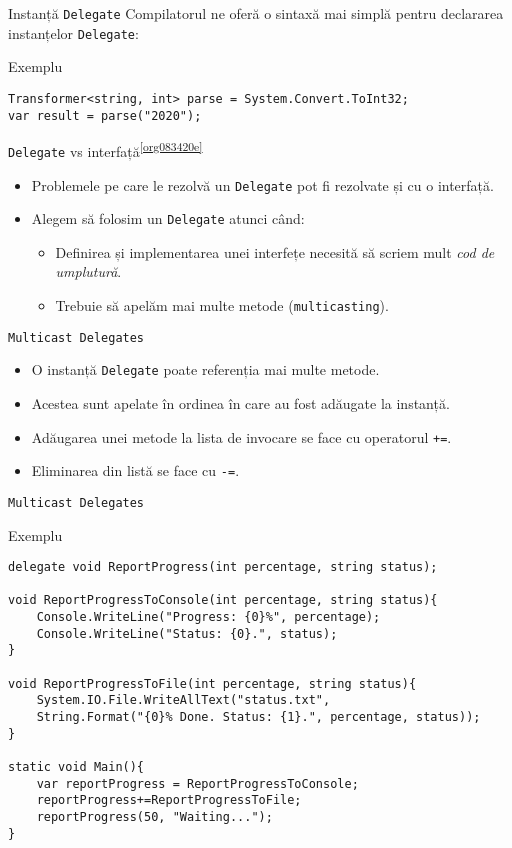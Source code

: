 \documentclass[presentation]{beamer}
\begin{document}
\begin{frame}[label={sec:org90f3885},fragile]{Instanță \texttt{Delegate}}
 Compilatorul ne oferă o sintaxă mai simplă pentru declararea instanțelor \texttt{Delegate}:
\begin{block}{Exemplu}
\begin{verbatim}
Transformer<string, int> parse = System.Convert.ToInt32;
var result = parse("2020");
\end{verbatim}
\end{block}
\end{frame}
\begin{frame}[label={sec:org1cbd9eb},fragile]{\texttt{Delegate} vs interfață\textsuperscript{\ref{org083420e}}}
 \begin{itemize}
\item Problemele pe care le rezolvă un \texttt{Delegate} pot fi rezolvate și cu o interfață.
\item Alegem să folosim un \texttt{Delegate} atunci când:
\begin{itemize}
\item Definirea și implementarea unei interfețe necesită să scriem mult \emph{cod de umplutură}.
\item Trebuie să apelăm mai multe metode (\texttt{multicasting}).
\end{itemize}
\end{itemize}
\end{frame}
\begin{frame}[label={sec:org9a68d4a},fragile]{\texttt{Multicast Delegates}}
 \begin{itemize}
\item O instanță \texttt{Delegate} poate referenția mai multe metode.
\item Acestea sunt apelate în ordinea în care au fost adăugate la instanță.
\item Adăugarea unei metode la lista de invocare se face cu operatorul \texttt{+=}.
\item Eliminarea din listă se face cu \texttt{-=}.
\end{itemize}
\end{frame}
\begin{frame}[label={sec:org43997b5},fragile]{\texttt{Multicast Delegates}}
 \begin{block}{Exemplu}
\begin{verbatim}
delegate void ReportProgress(int percentage, string status);

void ReportProgressToConsole(int percentage, string status){
    Console.WriteLine("Progress: {0}%", percentage);
    Console.WriteLine("Status: {0}.", status);
}

void ReportProgressToFile(int percentage, string status){
    System.IO.File.WriteAllText("status.txt",
	String.Format("{0}% Done. Status: {1}.", percentage, status));
}

static void Main(){
    var reportProgress = ReportProgressToConsole;
    reportProgress+=ReportProgressToFile;
    reportProgress(50, "Waiting...");
}
\end{verbatim}
\end{block}
\end{frame}
\end{document}
